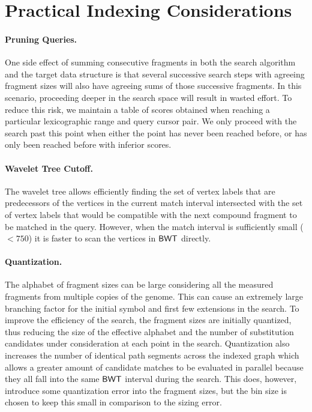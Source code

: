 
\section{Practical Indexing Considerations}

\paragraph{Pruning Queries.}

One side effect of summing consecutive fragments in both the search algorithm and the target data structure is that several successive search steps with agreeing fragment sizes will also have agreeing sums of those successive fragments.  In this scenario, proceeding deeper in the search space will result in wasted effort.
To reduce this risk, we maintain a table of scores obtained when reaching a particular lexicographic range and query cursor pair. We only proceed with the search past this point when either the point has never been reached before, or has only been reached before with inferior scores.

\paragraph{Wavelet Tree Cutoff.}
The wavelet tree allows efficiently finding the set of vertex labels that are predecessors of the vertices in the current match interval intersected with the set of vertex labels that would be compatible with the next compound fragment to be matched in the query.  However, when the match interval is sufficiently small ($ < 750 $) it is faster to scan the vertices in $\mbox{\rm {\sf BWT}}$ directly.

\paragraph{Quantization.}
The alphabet of fragment sizes can be large considering all the measured fragments from multiple copies of the genome.  This can cause an extremely large branching factor for the initial symbol and first few extensions in the search.  To improve the efficiency of the search, the fragment sizes are initially quantized, thus reducing the size of the effective alphabet and the number of substitution candidates under consideration at each point in the search.  Quantization also increases the number of identical path segments across the indexed graph which allows a greater amount of candidate matches to be evaluated in parallel because they all fall into the same $\mbox{\rm {\sf BWT}}$ interval during the search.  This does, however, introduce some quantization error into the fragment sizes, but the bin size is chosen to keep this small in comparison to the sizing error.

